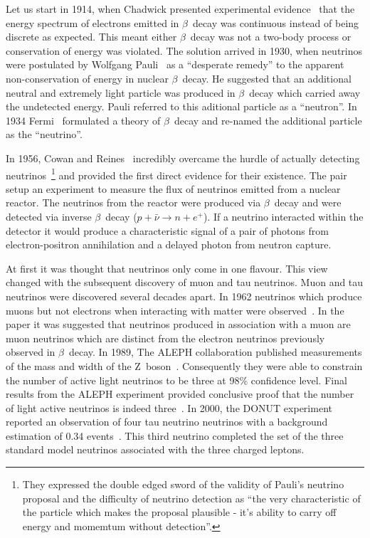 
Let us start in 1914, when Chadwick presented experimental
evidence~\cite{chadwick1914distribution} that the energy spectrum of
electrons emitted in $\beta$~decay was continuous instead of being
discrete as expected. This meant either $\beta$~decay was not a
two-body process or conservation of energy was violated.   
The solution arrived in 1930, when neutrinos were postulated by
Wolfgang Pauli~\cite{pauli1930letter} as a ``desperate remedy'' to the
apparent non-conservation of energy in nuclear $\beta$~decay. He
suggested that an additional neutral and extremely light
particle was produced in $\beta$~decay which carried away
the undetected energy.  
Pauli referred to this aditional particle as a ``neutron''. In 1934
Fermi~\cite{fermi1934tentativo} formulated a theory of $\beta$~decay
and re-named the additional particle as the ``neutrino''.

In 1956, Cowan and Reines~\cite{Reines:1956rs} incredibly overcame the
hurdle of actually detecting neutrinos~\footnote{They expressed the
  double edged sword of the validity of Pauli's neutrino proposal and
  the difficulty of neutrino detection as “the very characteristic of
  the particle which makes the proposal plausible - it’s ability to
  carry off energy and momemtum without detection”.} 
and provided the first
direct evidence for their existence. The pair setup an experiment to
measure the flux of neutrinos emitted from a nuclear reactor. The
neutrinos from the reactor were produced via $\beta$~decay and were
detected via inverse $\beta$~decay ($p + \bar{\nu} \rightarrow n +
e^+$). If a neutrino interacted within the detector it would produce a
characteristic signal of a pair of photons from electron-positron
annihilation and a delayed photon from neutron capture.

At first it was thought that neutrinos only come in one flavour. This
view changed with the subsequent discovery of muon and tau neutrinos. 
Muon and tau neutrinos were discovered several decades apart.
In 1962 neutrinos which produce muons but not electrons when
interacting with matter were
observed~\cite{MuonNeutrino:PhysRevLett.9.36}. In the paper it was
suggested that neutrinos produced in association
with a muon are muon neutrinos which are distinct
from the electron neutrinos previously observed in $\beta$~decay. 
In 1989, The ALEPH collaboration published measurements of the mass
and width of the Z~boson~\cite{ZWidth:Decamp:1989tu}. Consequently
they were able to constrain the 
number of active light neutrinos to be three at 98\% confidence level.
Final results from the ALEPH experiment provided conclusive proof that
the number of light active neutrinos is indeed three~\cite{ALEPH:2005ab}.
In 2000, the DONUT experiment reported an observation of four tau
neutrino neutrinos with a background estimation of 0.34
events~\cite{nutau:Kodama:2000mp}. This third neutrino completed the
set of the three standard model neutrinos associated with the three
charged leptons. 


